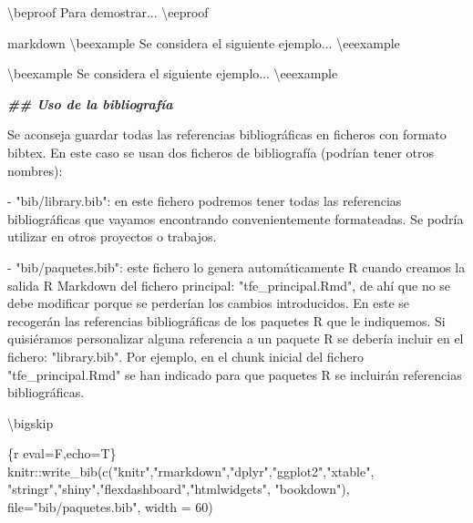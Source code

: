 \documentclass[11pt,a4paper,oneside,]{article}
\newenvironment{Shaded}{\begin{snugshade}}{\end{snugshade}}
\newcommand{\AttributeTok}[1]{\textcolor[rgb]{0.77,0.63,0.00}{#1}}
\newcommand{\DocumentationTok}[1]{\textcolor[rgb]{0.56,0.35,0.01}{\textbf{\textit{#1}}}}
\newcommand{\NormalTok}[1]{#1}
\newcommand{\SpecialCharTok}[1]{\textcolor[rgb]{0.00,0.00,0.00}{#1}}
\newcommand{\StringTok}[1]{\textcolor[rgb]{0.31,0.60,0.02}{#1}}
\numberwithin{dummy}{section}
\theoremstyle{ocrenumbox}
\theoremstyle{blacknumex}
\theoremstyle{blacknumbox}
\theoremstyle{ocrenum}
\theoremstyle{ocrenum}
\begin{document}
\begin{Shaded}
\begin{Highlighting}[numbers=left,,firstnumber=1101,]
\NormalTok{\textbackslash{}beproof}
\NormalTok{Para demostrar...}
\NormalTok{\textbackslash{}eeproof}

\StringTok{\textasciigrave{}\textasciigrave{}\textasciigrave{}}\AttributeTok{markdown}
\SpecialCharTok{\textbackslash{}b}\AttributeTok{eexample}
\AttributeTok{Se considera el siguiente ejemplo...}
\SpecialCharTok{\textbackslash{}e}\AttributeTok{eexample}
\StringTok{\textasciigrave{}\textasciigrave{}\textasciigrave{}}

\NormalTok{\textbackslash{}beexample}
\NormalTok{Se considera el siguiente ejemplo...}
\NormalTok{\textbackslash{}eeexample}

\DocumentationTok{\#\# Uso de la bibliografía}

\NormalTok{Se aconseja guardar todas las referencias bibliográficas en ficheros con formato bibtex. En este caso se usan dos ficheros de bibliografía (podrían tener otros nombres)}\SpecialCharTok{:}

\SpecialCharTok{{-}} \StringTok{"bib/library.bib"}\SpecialCharTok{:}\NormalTok{ en este fichero podremos tener todas las referencias bibliográficas que vayamos encontrando convenientemente formateadas. Se podría utilizar en otros proyectos o trabajos. }

\SpecialCharTok{{-}} \StringTok{"bib/paquetes.bib"}\SpecialCharTok{:}\NormalTok{ este fichero lo genera automáticamente R cuando creamos la salida R Markdown del fichero principal}\SpecialCharTok{:} \StringTok{"tfe\_principal.Rmd"}\NormalTok{, de ahí que no se debe modificar porque se perderían los cambios introducidos. En este se recogerán las referencias bibliográficas de los paquetes R que le indiquemos. Si quisiéramos personalizar alguna referencia a un paquete R se debería incluir en el fichero}\SpecialCharTok{:} \StringTok{"library.bib"}\NormalTok{. Por ejemplo, en el chunk inicial del fichero }\StringTok{"tfe\_principal.Rmd"}\NormalTok{ se han indicado para que paquetes R se incluirán referencias bibliográficas.}

\NormalTok{\textbackslash{}bigskip}

\StringTok{\textasciigrave{}\textasciigrave{}\textasciigrave{}}\AttributeTok{\{r eval=F,echo=T\}}
\AttributeTok{knitr::write\_bib(c("knitr","rmarkdown","dplyr","ggplot2","xtable",}
\AttributeTok{                   "stringr","shiny","flexdashboard","htmlwidgets",}
\AttributeTok{                   "bookdown"),}
\AttributeTok{                 file="bib/paquetes.bib", }
\AttributeTok{                 width = 60)}
\StringTok{\textasciigrave{}\textasciigrave{}\textasciigrave{}}




\end{Highlighting}
\end{Shaded}
\end{document}
